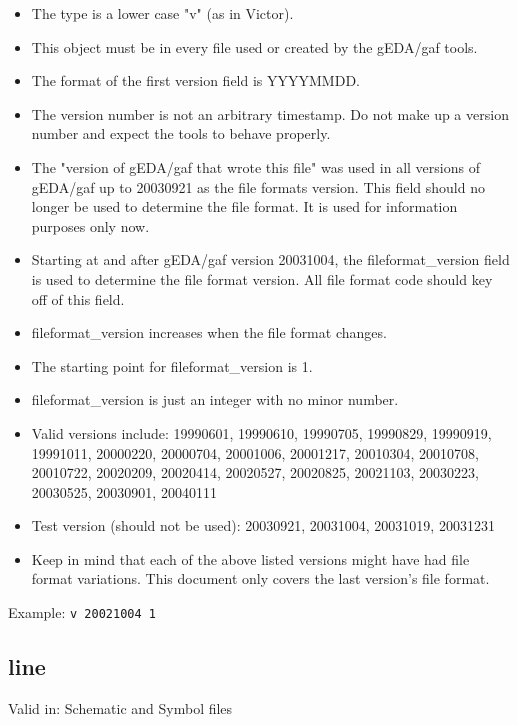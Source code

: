 \documentclass{article}
\begin{document}
\begin{itemize}
\item The type is a lower case "v" (as in Victor).
\item This object must be in every file used or created by the gEDA/gaf tools.
\item The format of the first version field is YYYYMMDD.  
\item The version number is not an arbitrary timestamp.  Do not make up a 
      version number and expect the tools to behave properly.  
\item The "version of gEDA/gaf that wrote this file" was used in all versions of gEDA/gaf up to 20030921 as the file formats version.  This field should no longer be used to determine the file format.  It is used for information purposes only now. 
\item Starting at and after gEDA/gaf version 20031004, the fileformat\_version field is used to determine the file format version.  All file format code should key off of this field.
\item fileformat\_version increases when the file format changes.
\item The starting point for fileformat\_version is 1.
\item fileformat\_version is just an integer with no minor number.

\item Valid versions include: 
19990601, 19990610, 19990705, 19990829, 19990919, 19991011, 20000220, 20000704,
20001006, 20001217, 20010304, 20010708, 20010722, 20020209, 20020414, 20020527,
20020825, 20021103, 20030223, 20030525, 20030901, 20040111

\item Test version (should not be used): 
20030921, 20031004, 20031019, 20031231

\item Keep in mind that each of the above listed versions might have had 
file format variations.  This document only covers the last version's file 
format.

\end{itemize}

Example: \newline
{\tt v 20021004 1}


\subsection{line}

Valid in: Schematic and Symbol files
\end{document}
